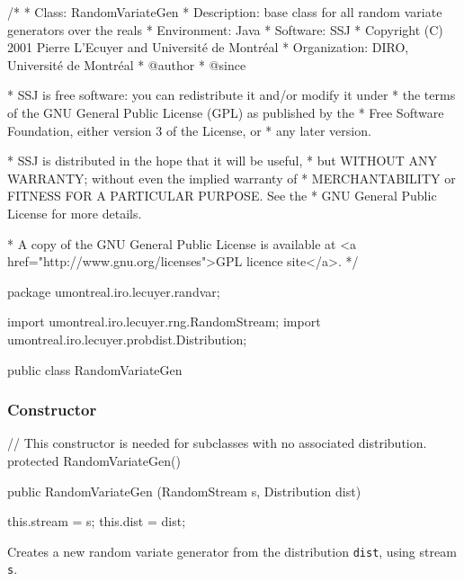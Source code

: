 \begin{code}
\begin{hide}
/*
 * Class:        RandomVariateGen
 * Description:  base class for all random variate generators over the reals 
 * Environment:  Java
 * Software:     SSJ 
 * Copyright (C) 2001  Pierre L'Ecuyer and Université de Montréal
 * Organization: DIRO, Université de Montréal
 * @author       
 * @since

 * SSJ is free software: you can redistribute it and/or modify it under
 * the terms of the GNU General Public License (GPL) as published by the
 * Free Software Foundation, either version 3 of the License, or
 * any later version.

 * SSJ is distributed in the hope that it will be useful,
 * but WITHOUT ANY WARRANTY; without even the implied warranty of
 * MERCHANTABILITY or FITNESS FOR A PARTICULAR PURPOSE.  See the
 * GNU General Public License for more details.

 * A copy of the GNU General Public License is available at
   <a href="http://www.gnu.org/licenses">GPL licence site</a>.
 */
\end{hide}
package umontreal.iro.lecuyer.randvar;\begin{hide}
import umontreal.iro.lecuyer.rng.RandomStream;
import umontreal.iro.lecuyer.probdist.Distribution;\end{hide}

public class RandomVariateGen \begin{hide} {

   protected RandomStream stream;
   // the stream used for generating random variates

   protected Distribution dist;
   // the distribution used by this generator

\end{hide}
\end{code}

\subsubsection* {Constructor}
\begin{code}\begin{hide}
 // This constructor is needed for subclasses with no associated distribution.
   protected RandomVariateGen() {}\end{hide}

   public RandomVariateGen (RandomStream s, Distribution dist) \begin{hide} {
      this.stream = s;
      this.dist   = dist;
   }\end{hide}
\end{code}
  \begin{tabb}  Creates a new random variate generator from the
    distribution \texttt{dist}, using stream \texttt{s}.
 \end{tabb}
\begin{htmlonly}
\end{htmlonly}

